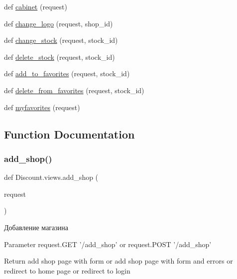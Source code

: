 \begin{DoxyCompactItemize}
def \hyperlink{namespace_discount_1_1views_aaf5ab473564754017d41b391c4ccc689}{cabinet} (request)
\item 
def \hyperlink{namespace_discount_1_1views_a4fa12ffebe567e85364025de7b2d84be}{change\+\_\+logo} (request, shop\+\_\+id)
\item 
def \hyperlink{namespace_discount_1_1views_a418332f381d43cd21532275955de41d9}{change\+\_\+stock} (request, stock\+\_\+id)
\item 
def \hyperlink{namespace_discount_1_1views_a8528cc1b935166d465b2ef597889bcb3}{delete\+\_\+stock} (request, stock\+\_\+id)
\item 
def \hyperlink{namespace_discount_1_1views_ad7b37be22e6ce0661d36af8dfdca6a4a}{add\+\_\+to\+\_\+favorites} (request, stock\+\_\+id)
\item 
def \hyperlink{namespace_discount_1_1views_a5559ac3262f5e7c78873ffbbf044007f}{delete\+\_\+from\+\_\+favorites} (request, stock\+\_\+id)
\item 
def \hyperlink{namespace_discount_1_1views_a0c55e16270014f1b56d16dc55c116c3d}{myfavorites} (request)
\end{DoxyCompactItemize}


\subsection{Function Documentation}
\mbox{\label{namespace_discount_1_1views_ac9256cde9ae572d015edf90e90f4b00b}} 
\subsubsection{\texorpdfstring{add\+\_\+shop()}{add\_shop()}}
{\footnotesize\ttfamily def Discount.\+views.\+add\+\_\+shop (\begin{DoxyParamCaption}\item[{}]{request }\end{DoxyParamCaption})}

\begin{DoxyVerb}Добавление магазина

Parameter
    request.GET '/add_shop'
    or
    request.POST '/add_shop'

Return
    add shop page with form or add shop page with form and errors or redirect to home page or redirect to login
\end{DoxyVerb}
 \mbox{\label{namespace_discount_1_1views_a96b5b651d32cec9071708084686e3ced}} 
